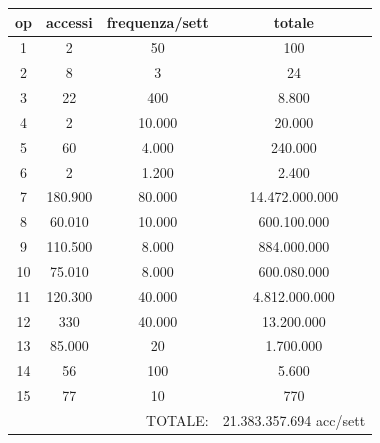 \documentclass[a4paper,12pt]{report}
\begin{document}
\begin{center}
\setlength{\tabcolsep}{18pt} %
\renewcommand{\arraystretch}{1.5} %
\begin{tabular}{c|c|c|c}
op & accessi & frequenza/sett & totale \\
\hline
\hline
1 & 2 & 50 & 100 \\ \hline
2 & 8 & 3 & 24 \\ \hline
3 & 22 & 400 & 8.800 \\ \hline
4 & 2 & 10.000 & 20.000 \\ \hline
5 & 60 & 4.000 & 240.000 \\ \hline
6 & 2 & 1.200 & 2.400 \\ \hline
7 & 180.900 & 80.000 & 14.472.000.000 \\ \hline
8 & 60.010 & 10.000 & 600.100.000 \\ \hline
9 & 110.500 & 8.000 & 884.000.000 \\ \hline
10 & 75.010 & 8.000 & 600.080.000 \\ \hline
11 & 120.300 & 40.000 & 4.812.000.000 \\ \hline
12 & 330 & 40.000 & 13.200.000 \\ \hline
13 & 85.000 & 20 & 1.700.000 \\ \hline 
14 & 56 & 100 & 5.600 \\ \hline
15 & 77 & 10 & 770 \\ \hline \hline
\multicolumn{3}{r|}{TOTALE:} & 21.383.357.694 acc/sett \\
\end{tabular}
\end{center}

\newpage
\end{document}
